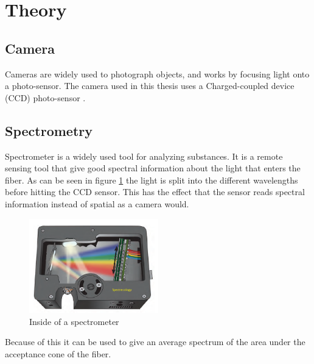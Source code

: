 \section{Theory}

\subsection{Camera}
Cameras are widely used to photograph objects, and works by focusing light onto a photo-sensor. The camera used in this thesis uses a Charged-coupled device (CCD) photo-sensor \cite{JYIVolumeThree}.

\subsection{Spectrometry}
Spectrometer is a widely used tool for analyzing substances. It is a remote sensing tool that give good spectral information about the light that enters the fiber. As can be seen in figure \ref{fig:spectrometer_inside} the light is split into the different wavelengths before hitting the CCD sensor. This has the effect that the sensor reads spectral information instead of spatial as a camera would. 

\begin{figure}[h]
    \centering
    \includegraphics[width=0.5\textwidth]{figures/Mini-spectrometer-open-bench.png}
    \caption{Inside of a spectrometer \cite{KAI0340640480}}
    \label{fig:spectrometer_inside}
\end{figure}

Because of this it can be used to give an average spectrum of the area under the acceptance cone of the fiber. 

